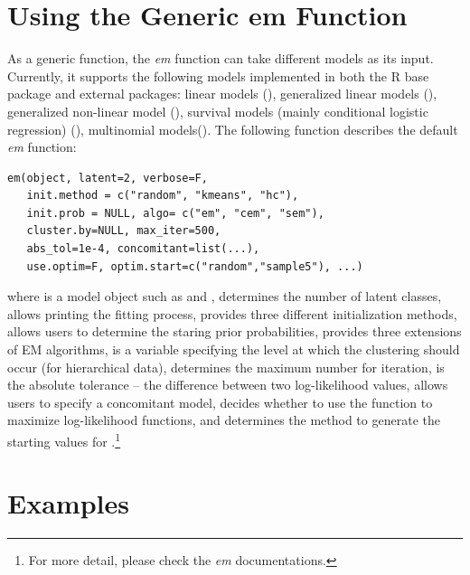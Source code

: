 \documentclass[nojss]{jss}
\begin{document}
   \section{Using the Generic em Function}
   As a generic function, the \emph{em} function can take different models as its input. Currently, it supports the following models implemented in both the R base package and external packages:  linear models (), generalized linear models (),  generalized non-linear model (),  survival models (mainly conditional logistic regression) (), multinomial models().
   The following function describes the default \emph{em} function:
\begin{lstlisting}
em(object, latent=2, verbose=F, 
   init.method = c("random", "kmeans", "hc"),
   init.prob = NULL, algo= c("em", "cem", "sem"),
   cluster.by=NULL, max_iter=500, 
   abs_tol=1e-4, concomitant=list(...),
   use.optim=F, optim.start=c("random","sample5"), ...)
\end{lstlisting}
    where  is a model object such as  and ,  determines the number of latent classes,  allows printing the fitting process,  provides three different initialization methods,  allows users to determine the staring prior probabilities,  provides three extensions of EM algorithms,  is a variable specifying the level at which the clustering should occur (for hierarchical data),  determines the maximum number for iteration,  is the absolute tolerance -- the difference between two log-likelihood values,  allows users to specify a concomitant model,  decides whether to use the function  to maximize log-likelihood functions, and  determines the method to generate the starting values for .\footnote{For more detail, please check the \emph{em} documentations.}
   \section{Examples}
\end{document}
